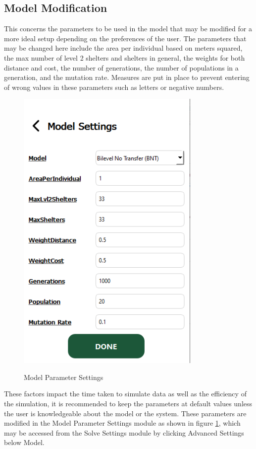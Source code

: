 \subsection{Model Modification}
	This concerns the parameters to be used in the model that may be modified for a more ideal setup depending on the preferences of the user. The parameters that may be changed here include the area per individual based on meters squared, the max number of level 2 shelters and shelters in general, the weights for both distance and cost, the number of generations, the number of populations in a generation, and the mutation rate. Measures are put in place to prevent entering of wrong values in these parameters such as letters or negative numbers. 
	
	\begin{figure}[h!]
		\caption{Model Parameter Settings}
		\centering
		\includegraphics[width=3.5in]{Chapter 4/modelsettings}
		\label{modelSet}
	\end{figure}
	These factors impact the time taken to simulate data as well as the efficiency of the simulation, it is recommended to keep the parameters at default values unless the user is knowledgeable about the model or the system. These parameters are modified in the Model Parameter Settings module as shown in figure \ref{modelSet}, which may be accessed from the Solve Settings module by clicking Advanced Settings below Model.
	
